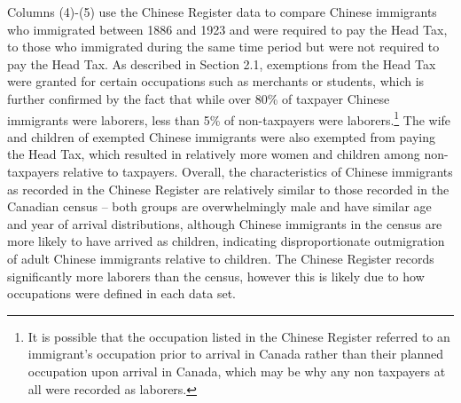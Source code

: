 Columns (4)-(5) use the Chinese Register data to compare Chinese immigrants who immigrated between 1886 and 1923 and were required to pay the Head Tax, to those who immigrated during the same time period but were not required to pay the Head Tax. As described in Section 2.1, exemptions from the Head Tax were granted for certain occupations such as merchants or students, which is further confirmed by the fact that while over 80\% of taxpayer Chinese immigrants were laborers, less than 5\% of non-taxpayers were laborers.\footnote{It is possible that the occupation listed in the Chinese Register referred to an immigrant's occupation prior to arrival in Canada rather than their planned occupation upon arrival in Canada, which may be why any non taxpayers at all were recorded as laborers.} The wife and children of exempted Chinese immigrants were also exempted from paying the Head Tax, which resulted in relatively more women and children among non-taxpayers relative to taxpayers. 
Overall, the characteristics of Chinese immigrants as recorded in the Chinese Register are relatively similar to those recorded in the Canadian census -- both groups are overwhelmingly male and have similar age and year of arrival distributions, although Chinese immigrants in the census are more likely to have arrived as children, indicating disproportionate outmigration of adult Chinese immigrants relative to children. The Chinese Register records significantly more laborers than the census, however this is likely due to how occupations were defined in each data set.



